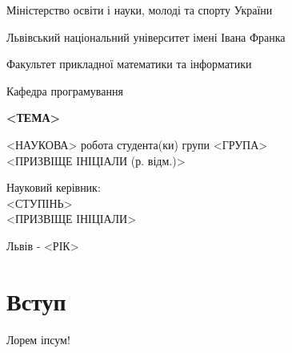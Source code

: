 \documentclass[12pt,a4paper]{article}
\begin{document}

\pagestyle{empty}
\setlength{\parindent}{1.5cm}
\fontsize{14pt}{6mm}\selectfont

\begin{center}
  Міністерство освіти і науки, молоді та спорту України
  
  Львівський національний університет імені Івана Франка

  Факультет прикладної математики та інформатики
\end{center}

\vspace{1cm}

\begin{flushright}
  Кафедра програмування
\end{flushright}

\vspace{4cm}

\begin{center}
  {\bfseries\Large <ТЕМА>}
\end{center}

\vspace{2cm}

\begin{small}
\begin{flushleft}
  <НАУКОВА> робота студента(ки) групи <ГРУПА>\\
  <ПРИЗВІЩЕ ІНІЦІАЛИ (р. відм.)>\linebreak
  
  Науковий керівник:\\
  <СТУПІНЬ>\\
  <ПРИЗВІЩЕ ІНІЦІАЛИ>
\end{flushleft}
\end{small}

\vspace{4cm}

\begin{center}
  Львів - <РІК> 
\end{center}

\clearpage



\fontsize{14pt}{6mm}\selectfont

\tableofcontents
\clearpage
\pagestyle{plain}
\section{Вступ}

Лорем іпсум!\cite{alias}
\end{document}
